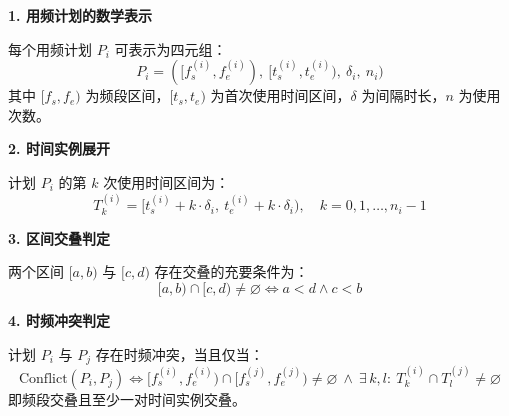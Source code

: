 
\textbf{1. 用频计划的数学表示}

每个用频计划 $P_i$ 可表示为四元组：
\begin{equation}
    P_i = ([f_s^{(i)}, f_e^{(i)}),\ [t_s^{(i)}, t_e^{(i)}),\ \delta_i,\ n_i)
\end{equation}
其中 $[f_s, f_e)$ 为频段区间，$[t_s, t_e)$ 为首次使用时间区间，$\delta$ 为间隔时长，$n$ 为使用次数。

\textbf{2. 时间实例展开}

计划 $P_i$ 的第 $k$ 次使用时间区间为：
\begin{equation}
    T_k^{(i)} = [t_s^{(i)} + k \cdot \delta_i,\ t_e^{(i)} + k \cdot \delta_i), \quad k = 0, 1, \ldots, n_i - 1
\end{equation}

\textbf{3. 区间交叠判定}

两个区间 $[a, b)$ 与 $[c, d)$ 存在交叠的充要条件为：
\begin{equation}
    [a, b) \cap [c, d) \neq \varnothing \iff a < d \land c < b
\end{equation}

\textbf{4. 时频冲突判定}

计划 $P_i$ 与 $P_j$ 存在时频冲突，当且仅当：
\begin{equation}
    \text{Conflict}(P_i, P_j) \iff [f_s^{(i)}, f_e^{(i)}) \cap [f_s^{(j)}, f_e^{(j)}) \neq \varnothing \ \land\ \exists\, k, l:\ T_k^{(i)} \cap T_l^{(j)} \neq \varnothing
\end{equation}
即频段交叠且至少一对时间实例交叠。
